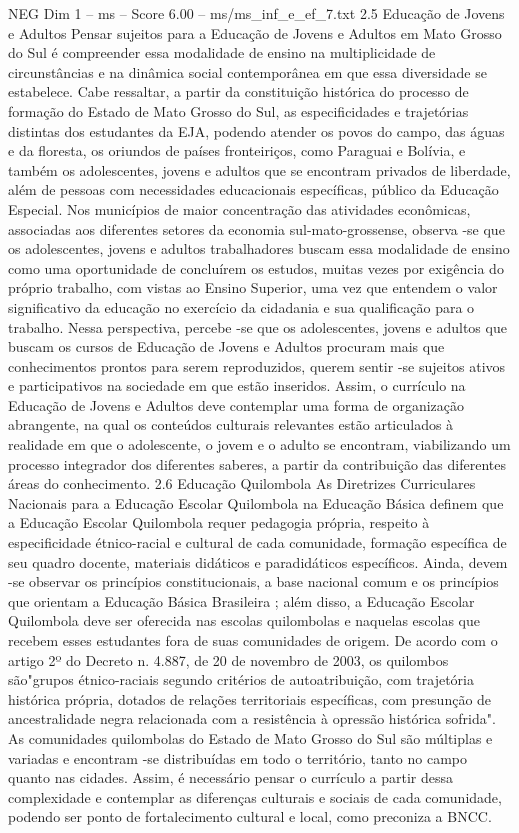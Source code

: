 \begin{textsample}{NEG Dim 1 – ms – Score 6.00 – ms/ms\_inf\_e\_ef\_7.txt}  \label{ex:f1_neg_110}
2.5 Educação de Jovens e Adultos Pensar sujeitos para a Educação de Jovens e Adultos em Mato Grosso do Sul é compreender essa modalidade de ensino na multiplicidade de circunstâncias e na dinâmica social contemporânea em que essa diversidade se estabelece.
Cabe ressaltar, a partir da constituição histórica do processo de formação do Estado de Mato Grosso do Sul, as especificidades e trajetórias distintas dos estudantes da EJA, podendo atender os povos do campo, das águas e da floresta, os oriundos de países fronteiriços, como Paraguai e Bolívia, e também os adolescentes, jovens e adultos que se encontram privados de liberdade, além de pessoas com necessidades educacionais específicas, público da Educação Especial.
Nos municípios de maior concentração das atividades econômicas, associadas aos diferentes setores da economia sul-mato-grossense, observa -se que os adolescentes, jovens e adultos trabalhadores buscam essa modalidade de ensino como uma oportunidade de concluírem os estudos, muitas vezes por exigência do próprio trabalho, com vistas ao Ensino Superior, uma vez que entendem o valor significativo da educação no exercício da cidadania e sua qualificação para o trabalho.
Nessa perspectiva, percebe -se que os adolescentes, jovens e adultos que buscam os cursos de Educação de Jovens e Adultos procuram mais que conhecimentos prontos para serem reproduzidos, querem sentir -se sujeitos ativos e participativos na sociedade em que estão inseridos.
Assim, o currículo na Educação de Jovens e Adultos deve contemplar uma forma de organização abrangente, na qual os conteúdos culturais relevantes estão articulados à realidade em que o adolescente, o jovem e o adulto se encontram, viabilizando um processo integrador dos diferentes saberes, a partir da contribuição das diferentes áreas do conhecimento. 2.6 Educação Quilombola As Diretrizes Curriculares Nacionais para a Educação Escolar Quilombola na Educação Básica definem que a Educação Escolar Quilombola requer pedagogia própria, respeito à especificidade étnico-racial e cultural de cada comunidade, formação específica de seu quadro docente, materiais didáticos e paradidáticos específicos.
Ainda, devem -se observar os princípios constitucionais, a base nacional comum e os princípios que orientam a Educação Básica Brasileira ; além disso, a Educação Escolar Quilombola deve ser oferecida nas escolas quilombolas e naquelas escolas que recebem esses estudantes fora de suas comunidades de origem.
De acordo com o artigo 2º do Decreto n. 4.887, de 20 de novembro de 2003, os quilombos são"grupos étnico-raciais segundo critérios de autoatribuição, com trajetória histórica própria, dotados de relações territoriais específicas, com presunção de ancestralidade negra relacionada com a resistência à opressão histórica sofrida".
As comunidades quilombolas do Estado de Mato Grosso do Sul são múltiplas e variadas e encontram -se distribuídas em todo o território, tanto no campo quanto nas cidades.
Assim, é necessário pensar o currículo a partir dessa complexidade e contemplar as diferenças culturais e sociais de cada comunidade, podendo ser ponto de fortalecimento cultural e local, como preconiza a BNCC.

\end{textsample}
